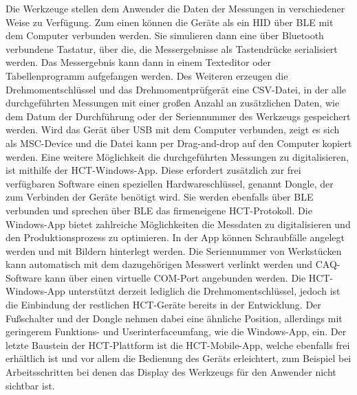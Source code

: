 Die Werkzeuge stellen dem Anwender die Daten der Messungen in verschiedener Weise zu Verfügung. Zum einen können die Geräte als ein \ac{HID} über \ac{BLE} mit dem Computer verbunden werden. Sie simulieren dann eine über Bluetooth verbundene Tastatur, über die, die Messergebnisse als Tastendrücke serialisiert werden. Das Messergebnis kann dann in einem Texteditor oder Tabellenprogramm aufgefangen werden. Des Weiteren erzeugen die Drehmomentschlüssel und das Drehmomentprüfgerät eine \ac{CSV}-Datei, in der alle durchgeführten Messungen mit einer großen Anzahl an zusätzlichen Daten, wie dem Datum der Durchführung oder der Seriennummer des Werkzeugs gespeichert werden. Wird das Gerät über \ac{USB} mit dem Computer verbunden, zeigt es sich als \ac{MSC}-Device und die Datei kann per Drag-and-drop auf den Computer kopiert werden. Eine weitere Möglichkeit die durchgeführten Messungen zu digitalisieren, ist mithilfe der \ac{HCT}-Windows-App. Diese erfordert zusätzlich zur frei verfügbaren Software einen speziellen Hardwareschlüssel, genannt Dongle, der zum Verbinden der Geräte benötigt wird. Sie werden ebenfalls über \ac{BLE} verbunden und sprechen über \ac{BLE} das firmeneigene \ac{HCT}-Protokoll. Die Windows-App bietet zahlreiche Möglichkeiten die Messdaten zu digitalisieren und den Produktionsprozess zu optimieren. In der App können Schraubfälle angelegt werden und mit Bildern hinterlegt werden. Die Seriennummer von Werkstücken kann automatisch mit dem dazugehörigen Messwert verlinkt werden und \ac{CAQ}-Software kann über einen virtuelle COM-Port angebunden werden. Die \ac{HCT}-Windows-App unterstützt derzeit lediglich die Drehmomentschlüssel, jedoch ist die Einbindung der restlichen \ac{HCT}-Geräte bereits in der Entwicklung. Der Fußschalter und der Dongle nehmen dabei eine ähnliche Position, allerdings mit geringerem Funktions- und Userinterfaceumfang, wie die Windows-App, ein. Der letzte Baustein der \ac{HCT}-Plattform ist die \ac{HCT}-Mobile-App, welche ebenfalls frei erhältlich ist und vor allem die Bedienung des Geräts erleichtert, zum Beispiel bei Arbeitsschritten bei denen das Display des Werkzeugs für den Anwender nicht sichtbar ist.

